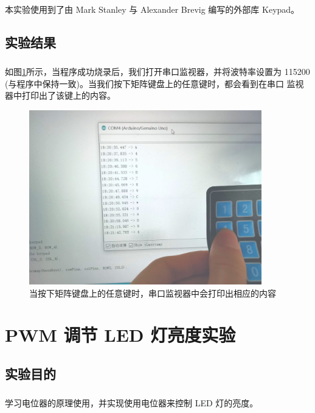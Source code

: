 \documentclass[UTF8, oneside]{ctexbook}
\begin{document}
\paragraph{}
本实验使用到了由 Mark Stanley 与 Alexander Brevig 编写的外部库 Keypad。


\section{实验结果}
\paragraph{}
如图\ref{b5_1}所示，当程序成功烧录后，我们打开串口监视器，并将波特率设置为
115200 (与程序中保持一致)。当我们按下矩阵键盘上的任意键时，都会看到在串口
监视器中打印出了该键上的内容。
\begin{figure}[h]
    \centering
    \includegraphics[width=0.9\textwidth]{./result/basic/5/result2.jpg}
    \caption{当按下矩阵键盘上的任意键时，串口监视器中会打印出相应的内容}
    \label{b5_1}
\end{figure}

\chapter{PWM 调节 LED 灯亮度实验}

\section{实验目的}
\paragraph{}
学习电位器的原理使用，并实现使用电位器来控制 LED 灯的亮度。
\end{document}
